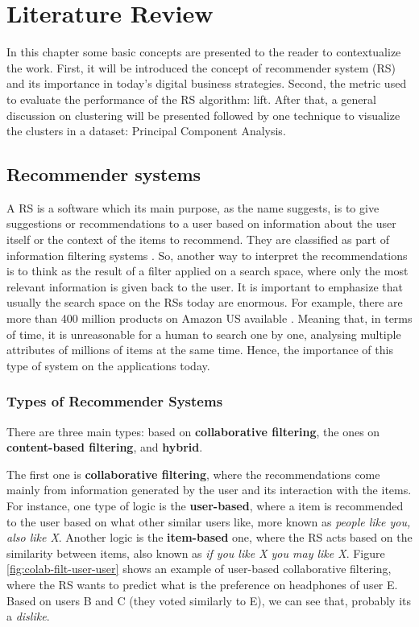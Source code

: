 \newcommand{\ASKA}{$\text{ASK}^0$}
\newcommand{\ASKS}{$\text{ASK}^*$}

\chapter{Literature Review}

In this chapter some basic concepts are presented to the reader to contextualize the work. First, it will be introduced the concept of recommender system (RS) and its importance in today's digital business strategies. Second, the metric used to evaluate the performance of the RS algorithm: lift. After that, a general discussion on clustering will be presented followed by one technique to visualize the clusters in a dataset: Principal Component Analysis.

\section{Recommender systems}

A RS is a software which its main purpose, as the name suggests, is to give suggestions \cite{ricci2011introduction} or recommendations to a user based on information about the user itself or the context of the items to recommend. They are classified as part of information filtering systems \cite{RecommendersystemWikipedia}. So, another way to interpret the recommendations is to think as the result of a filter applied on a search space, where only the most relevant information is given back to the user. It is important to emphasize that usually the search space on the RSs today are enormous. For example, there are more than 400 million products on Amazon US available \cite{amazon-number-of-products-2015}. Meaning that, in terms of time, it is unreasonable for a human to search one by one, analysing multiple attributes of millions of items at the same time. Hence, the importance of this type of system on the applications today.

\subsection{Types of Recommender Systems}

There are three main types: based on \textbf{collaborative filtering}, the ones on \textbf{content-based filtering}, and \textbf{hybrid}. 

The first one is \textbf{collaborative filtering}, where the recommendations come mainly from information generated by the user and its interaction with the items. For instance, one type of logic is the \textbf{user-based}, where a item is recommended to the user based on what other similar users like, more known as \textit{people like you, also like X}. Another logic is the \textbf{item-based} one, where the RS acts based on the similarity between items, also known as \textit{if you like X you may like X}. Figure \ref{fig:colab-filt-user-user} shows an example of user-based collaborative filtering, where the RS wants to predict what is the preference on headphones of user E. Based on users B and C (they voted similarly to E), we can see that, probably its a \textit{dislike}.


